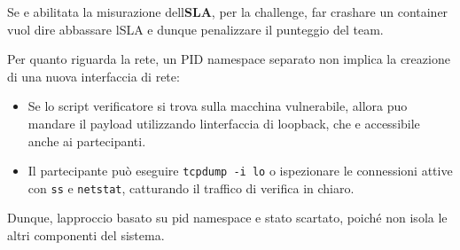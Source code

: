 Se e\textquotesingle{} abilitata la misurazione
dell\textquotesingle{}\textbf{SLA}, per la challenge, far crashare un
container vuol dire abbassare l\textquotesingle SLA e dunque penalizzare
il punteggio del team.

Per quanto riguarda la rete, un PID namespace separato non implica la
creazione di una nuova interfaccia di rete:

\begin{itemize}
\tightlist
\item
  Se lo script verificatore si trova sulla macchina vulnerabile, allora
  puo\textquotesingle{} mandare il payload utilizzando
  l\textquotesingle interfaccia di loopback, che e\textquotesingle{}
  accessibile anche ai partecipanti.
\item
  Il partecipante può eseguire \passthrough{\lstinline!tcpdump -i lo!} o
  ispezionare le connessioni attive con \passthrough{\lstinline!ss!} e
  \passthrough{\lstinline!netstat!}, catturando il traffico di verifica
  in chiaro.
\end{itemize}

Dunque, l\textquotesingle approccio basato su pid namespace
e\textquotesingle{} stato scartato, poiché non isola le altri componenti
del sistema.
